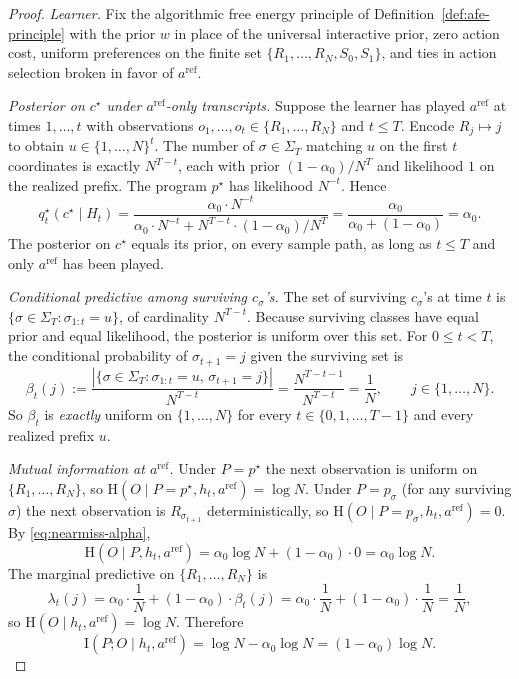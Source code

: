 \documentclass[11pt]{article}
\theoremstyle{definition}
\theoremstyle{remark}
\newcommand{\I}{\mathrm{I}}
\newcommand{\Hh}{\mathrm{H}}
\begin{document}
\begin{proof}
\emph{Learner.} Fix the algorithmic free energy principle of Definition~\ref{def:afe-principle} with the prior $w$ in place of the universal interactive prior, zero action cost, uniform preferences on the finite set $\{R_1,\dots,R_N,S_0,S_1\}$, and ties in action selection broken in favor of $a^{\mathrm{ref}}$.

\emph{Posterior on $c^\star$ under $a^{\mathrm{ref}}$-only transcripts.} Suppose the learner has played $a^{\mathrm{ref}}$ at times $1,\dots,t$ with observations $o_1,\dots,o_t\in\{R_1,\dots,R_N\}$ and $t\le T$. Encode $R_j\mapsto j$ to obtain $u\in\{1,\dots,N\}^t$. The number of $\sigma\in\Sigma_T$ matching $u$ on the first $t$ coordinates is exactly $N^{T-t}$, each with prior $(1-\alpha_0)/N^T$ and likelihood $1$ on the realized prefix. The program $p^\star$ has likelihood $N^{-t}$. Hence
\begin{equation}
\label{eq:nearmiss-alpha}
q_t^\star(c^\star\mid H_t)=\frac{\alpha_0\cdot N^{-t}}{\alpha_0\cdot N^{-t}+N^{T-t}\cdot (1-\alpha_0)/N^T}=\frac{\alpha_0}{\alpha_0+(1-\alpha_0)}=\alpha_0.
\end{equation}
The posterior on $c^\star$ equals its prior, on every sample path, as long as $t\le T$ and only $a^{\mathrm{ref}}$ has been played.

\emph{Conditional predictive among surviving $c_\sigma$'s.} The set of surviving $c_\sigma$'s at time $t$ is $\{\sigma\in\Sigma_T:\sigma_{1:t}=u\}$, of cardinality $N^{T-t}$. Because surviving classes have equal prior and equal likelihood, the posterior is uniform over this set. For $0\le t<T$, the conditional probability of $\sigma_{t+1}=j$ given the surviving set is
\[
\beta_t(j):=\frac{|\{\sigma\in\Sigma_T:\sigma_{1:t}=u,\,\sigma_{t+1}=j\}|}{N^{T-t}}=\frac{N^{T-t-1}}{N^{T-t}}=\frac{1}{N},
\qquad j\in\{1,\dots,N\}.
\]
So $\beta_t$ is \emph{exactly} uniform on $\{1,\dots,N\}$ for every $t\in\{0,1,\dots,T-1\}$ and every realized prefix $u$.

\emph{Mutual information at $a^{\mathrm{ref}}$.} Under $P=p^\star$ the next observation is uniform on $\{R_1,\dots,R_N\}$, so $\Hh(O\mid P=p^\star,h_t,a^{\mathrm{ref}})=\log N$. Under $P=p_\sigma$ (for any surviving $\sigma$) the next observation is $R_{\sigma_{t+1}}$ deterministically, so $\Hh(O\mid P=p_\sigma,h_t,a^{\mathrm{ref}})=0$. By \eqref{eq:nearmiss-alpha},
\[
\Hh(O\mid P,h_t,a^{\mathrm{ref}})=\alpha_0\log N+(1-\alpha_0)\cdot 0=\alpha_0\log N.
\]
The marginal predictive on $\{R_1,\dots,R_N\}$ is
\[
\lambda_t(j)=\alpha_0\cdot\frac{1}{N}+(1-\alpha_0)\cdot\beta_t(j)=\alpha_0\cdot\frac{1}{N}+(1-\alpha_0)\cdot\frac{1}{N}=\frac{1}{N},
\]
so $\Hh(O\mid h_t,a^{\mathrm{ref}})=\log N$. Therefore
\begin{equation}
\label{eq:mi-ref}
\I(P;O\mid h_t,a^{\mathrm{ref}})=\log N-\alpha_0\log N=(1-\alpha_0)\log N.
\end{equation}


\end{proof}
\end{document}
